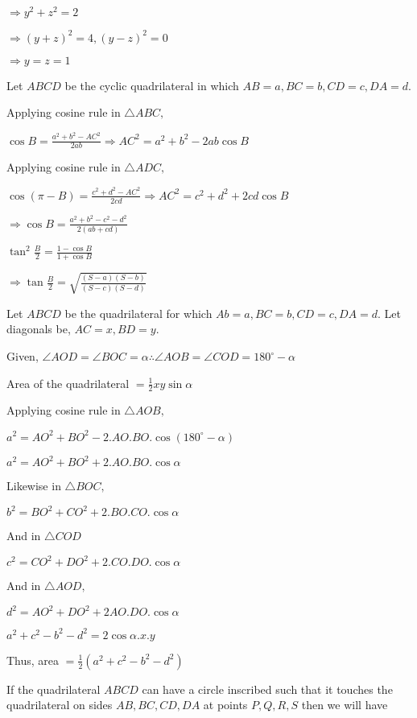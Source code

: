   $\Rightarrow y^2 + z^2 = 2$

  $\Rightarrow (y + z)^2 = 4, (y - z)^2 = 0$

  $\Rightarrow y = z = 1$

\item Let $ABCD$ be the cyclic quadrilateral in which $AB = a, BC = b, CD = c, DA =d.$

  Applying cosine rule in $\triangle ABC,$

  $\cos B = \frac{a^2 + b^2 - AC^2}{2ab} \Rightarrow AC^2 = a^2 + b^2 - 2ab\cos B$

  Applying cosine rule in $\triangle ADC,$

  $\cos(\pi - B) = \frac{c^2 + d^2 - AC^2}{2cd} \Rightarrow AC^2 = c^2 + d^2 + 2cd\cos B$

  $\Rightarrow \cos B = \frac{a^2 + b^2 - c^2 - d^2}{2(ab + cd)}$

  $\tan^2\frac{B}{2}= \frac{1 - \cos B}{1 + \cos B}$

  $\Rightarrow \tan\frac{B}{2} = \sqrt{\frac{(S - a)(S - b)}{(S - c)(S - d)}}$

\item Let $ABCD$ be the quadrilateral for which $Ab = a, BC=b, CD=c, DA = d.$ Let diagonals be, $AC=x, BD = y.$

  Given, $\angle AOD = \angle BOC = \alpha \therefore \angle AOB = \angle COD = 180^\circ - \alpha$

  Area of the quadrilateral $= \frac{1}{2}xy\sin\alpha$

  Applying cosine rule in $\triangle AOB,$

  $a^2 = AO^2 + BO^2 - 2.AO.BO.\cos(180^\circ - \alpha)$

  $a^2 = AO^2 + BO^2 + 2.AO.BO.\cos\alpha$

  Likewise in $\triangle BOC,$

  $b^2 = BO^2 + CO^2 + 2.BO.CO.\cos \alpha$

  And in $\triangle COD$

  $c^2 = CO^2 + DO^2 + 2.CO.DO.\cos\alpha$

  And in $\triangle AOD,$

  $d^2 = AO^2 + DO^2 + 2AO.DO.\cos\alpha$

  $a^2 + c ^2 - b^2 - d^2 = 2\cos\alpha.x.y$

  Thus, area $= \frac{1}{2}(a^2 + c^2 - b^2 - d^2)$

\item If the quadrilateral $ABCD$ can have a circle inscribed such that it touches the quadrilateral on sides $AB, BC,
  CD, DA$ at points $P,Q,R,S$ then we will have

